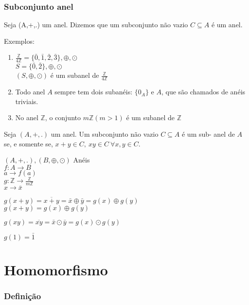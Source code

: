 \subsubsection{Subconjunto anel}
\begin{definicao} Seja (A,+,.) um anel. Dizemos que um subconjunto n{\~a}o vazio $C\subseteq A$ {\'e} um anel.\end{definicao}

Exemplos:
\begin{enumerate}
\item $\displaystyle\frac{\mathbb{Z}}{4\mathbb{Z}}=\{\bar{0},\bar{1},\bar{2},\bar{3}\},\oplus,\odot$\\
$S=\{\bar{0},\bar{2}\},\oplus,\odot$\\
$(S,\oplus,\odot)$ {\'e} um subanel de $\displaystyle\frac{\mathbb{Z}}{4\mathbb{Z}}$
\item Todo anel $A$ sempre tem dois suban{\'e}is: $\{0_{A}\}$ e $A$, que s{\~a}o chamados de an{\'e}is triviais.
\item No anel $\mathbb{Z}$, o conjunto $m\mathbb{Z}(m>1)$ {\'e} um subanel de $\mathbb{Z}$
\end{enumerate}

\begin{proposicao} Seja $(A,+,.)$ um anel. Um subconjunto n{\~a}o vazio $C\subseteq A$ {\'e} um sub- anel de $A$ se, e somente se, $x+y\in C,\ xy\in C\ \forall x,y\in C$.\end{proposicao}

$(A,+,.),(B,\oplus,\odot)$ An{\'e}is\\
$f:A\rightarrow B$\\
$a\rightarrow f(a)$\\
$g:\mathbb{Z}\rightarrow \displaystyle\frac{\mathbb{Z}}{m\mathbb{Z}}$\\
$x\rightarrow\bar{x}$

$g(x+y)=\overline{x+y}=\bar{x}\oplus\bar{y}=g(x)\oplus g(y)$\\
$g(x+y)=g(x)\oplus g(y)$

$g(xy)=\overline{xy}=\bar{x}\odot\bar{y}=g(x)\odot g(y)$

$g(1)=\bar{1}$

\section{Homomorfismo}
\subsubsection{Defini{\c c}{\~a}o}

